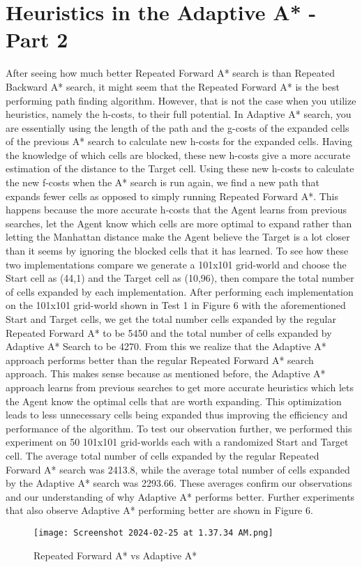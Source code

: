 \documentclass{article}
\begin{document}
\section{Heuristics in the Adaptive A* - Part 2}
After seeing how much better Repeated Forward A* search is than Repeated Backward A* search, it might seem that the Repeated Forward A* is the best performing path finding algorithm. However, that is not the case when you utilize heuristics, namely the h-costs, to their full potential. In Adaptive A* search, you are essentially using the length of the path and the g-costs of the expanded cells of the previous A* search to calculate new h-costs for the expanded cells. Having the knowledge of which cells are blocked, these new h-costs give a more accurate estimation of the distance to the Target cell. Using these new h-costs to calculate the new f-costs when the A* search is run again, we find a new path that expands fewer cells as opposed to simply running Repeated Forward A*. This happens because the more accurate h-costs that the Agent learns from previous searches, let the Agent know which cells are more optimal to expand rather than letting the Manhattan distance make the Agent believe the Target is a lot closer than it seems by ignoring the blocked cells that it has learned. 
\newline
\newline
To see how these two implementations compare we generate a 101x101 grid-world and choose the Start cell as (44,1) and the Target cell as (10,96), then compare the total number of cells expanded by each implementation. After performing each implementation on the 101x101 grid-world shown in Test 1 in Figure 6 with the aforementioned Start and Target cells, we get the total number cells expanded by the regular Repeated Forward A* to be 5450 and the total number of cells expanded by Adaptive A* Search to be 4270. From this we realize that the Adaptive A* approach performs better than the regular Repeated Forward A* search approach. This makes sense because as mentioned before, the Adaptive A* approach learns from previous searches to get more accurate heuristics which lets the Agent know the optimal cells that are worth expanding. This optimization leads to less unnecessary cells being expanded thus improving the efficiency and performance of the algorithm. To test our observation further, we performed this experiment on 50 101x101 grid-worlds each with a randomized Start and Target cell. The average total number of cells expanded by the regular Repeated Forward A* search was 2413.8, while the average total number of cells expanded by the Adaptive A* search was 2293.66. These averages confirm our observations and our understanding of why Adaptive A* performs better. Further experiments that also observe Adaptive A* performing better are shown in Figure 6.
\begin{figure}[h]
    \centering
    \texttt{[image: Screenshot 2024-02-25 at 1.37.34 AM.png]}
    \caption{Repeated Forward A* vs Adaptive A*}
    \label{fig:example}
\end{figure}
\end{document}
